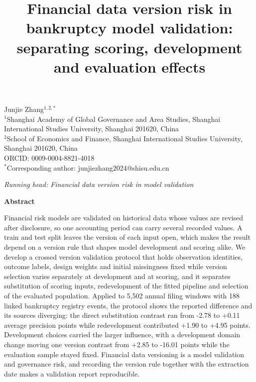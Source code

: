 \documentclass[10pt,a4paper,twocolumn]{article}
\title{\vspace{-12mm}\bfseries Financial data version risk in bankruptcy model validation: separating scoring, development and evaluation effects}
\author{}
\date{}
\begin{document}
\begin{center}
{\normalsize Junjie Zhang$^{1,2,*}$}\\[2pt]
{\footnotesize $^1$Shanghai Academy of Global Governance and Area Studies, Shanghai International Studies University, Shanghai 201620, China\\[1pt]
$^2$School of Economics and Finance, Shanghai International Studies University, Shanghai 201620, China\\[2pt]
ORCID: 0009-0004-8821-4018\\[1pt]
$^*$Corresponding author: junjiezhang2024@shisu.edu.cn}
\end{center}\vspace{2pt}
\renewcommand{\thefootnote}{\fnsymbol{footnote}}
\renewcommand{\thefootnote}{\arabic{footnote}}
\begin{center}\small\textit{Running head: Financial data version risk in model validation}\end{center}\vspace{4pt}
\noindent\textbf{Abstract}\par\vspace{2pt}
Financial risk models are validated on historical data whose values are revised after disclosure, so one accounting period can carry several recorded values. A train and test split leaves the version of each input open, which makes the result depend on a version rule that shapes model development and scoring alike. We develop a crossed version validation protocol that holds observation identities, outcome labels, design weights and initial missingness fixed while version selection varies separately at development and at scoring, and it separates substitution of scoring inputs, redevelopment of the fitted pipeline and selection of the evaluated population. Applied to 5,502 annual filing windows with 188 linked bankruptcy registry events, the protocol shows the reported difference and its sources diverging: the direct substitution contrast ran from -2.78 to +0.11 average precision points while redevelopment contributed +1.90 to +4.95 points. Development choices carried the larger influence, with a development domain change moving one version contrast from +2.85 to -16.01 points while the evaluation sample stayed fixed. Financial data versioning is a model validation and governance risk, and recording the version rule together with the extraction date makes a validation report reproducible.
\end{document}
